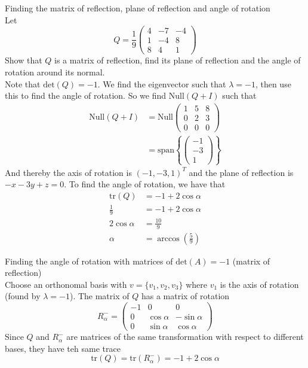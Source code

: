\documentclass[journal, letterpaper]{IEEEtran}
\begin{document}
    \begin{myboxg}{Finding the matrix of reflection, plane of reflection and angle of rotation} \\ 
        Let 
        $$ Q = \frac{1}{9}\begin{pmatrix}
            4 & -7 & -4 \\ 1 & -4 & 8 \\ 8 & 4 & 1
        \end{pmatrix}$$
        Show that $Q$ is a matrix of reflection, find its plane of reflection and the angle of rotation around its normal.
        \newline \\
        Note that $\text{det}(Q) = -1$. We find the eigenvector such that $\lambda = -1$, then use this to find the angle of rotation. So we find $\text{Null}(Q + I)$ such that 
        \begin{align*}
        \text{Null}(Q + I) &= \text{Null}\begin{pmatrix}
            1 & 5 & 8 \\ 0 & 2 & 3 \\ 0 & 0 & 0
        \end{pmatrix} \\ 
        &= \text{span}\left\{ \begin{pmatrix}
        -1 \\ -3 \\ 1
        \end{pmatrix} \right\}
        \end{align*}
        And thereby the axis of rotation is $(-1, -3, 1)^T$ and the plane of reflection is $-x - 3y + z = 0$. To find the angle 
        of rotation, we have that
        \begin{align*}
            \text{tr}(Q) &= -1 + 2\cos\alpha \\
            \frac{1}{9} &= -1 + 2\cos\alpha \\
            2\cos\alpha &= \frac{10}{9} \\ 
            \alpha &= \arccos\left(\frac{5}{9}\right)
        \end{align*}
    \end{myboxg}
    \begin{myboxr}{Finding the angle of rotation with matrices of $\text{det}(A) = -1$ (matrix of reflection)} \\ 
        Choose an orthonomal basis with $v = \{v_1, v_2, v_3\}$ where $v_1$ is the axis of rotation (found by $\lambda = -1$). The matrix of $Q$ has a matrix of rotation $$R_{\alpha}^{-} = \begin{pmatrix}
            -1 & 0 & 0 \\ 0 & \cos\alpha & -\sin\alpha \\ 0 & \sin\alpha & \cos\alpha
        \end{pmatrix}$$
        Since $Q$ and $R_{\alpha}^{-}$ are matrices of the same transformation with respect to different bases, they have teh same trace
        $$\text{tr}(Q) = \text{tr}(R_{\alpha}^{-}) = -1 + 2\cos\alpha$$
    \end{myboxr}
\end{document}
